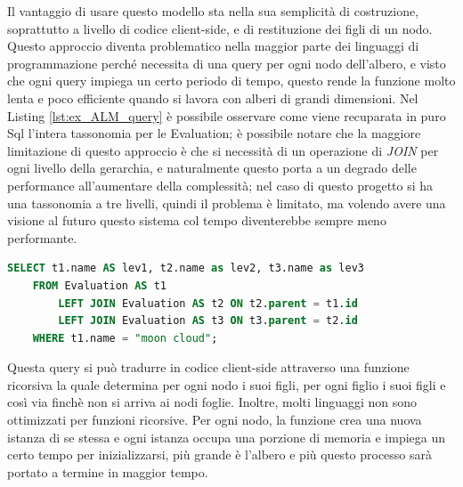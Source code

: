 \hfill\break
Il vantaggio di usare questo modello sta nella sua semplicità di costruzione, soprattutto a livello di codice client-side, 
e di restituzione dei figli di un nodo. Questo approccio diventa problematico nella maggior parte dei linguaggi 
di programmazione perché necessita di una query per ogni nodo dell'albero, e visto che ogni query impiega un certo periodo di tempo, 
questo rende la funzione molto lenta e poco efficiente quando si lavora con alberi di grandi dimensioni.\hfill\break
Nel Listing \ref{lst:ex_ALM_query} è possibile osservare come viene recuparata in puro Sql l'intera tassonomia per le Evaluation; 
è possibile notare che la maggiore limitazione di questo approccio è che si necessità di un operazione di \textit{JOIN} per ogni livello 
della gerarchia, e naturalmente questo porta a un degrado delle performance all'aumentare della complessità; nel caso di questo progetto
si ha una tassonomia a tre livelli, quindi il problema è limitato, ma volendo avere una visione al futuro questo sistema col tempo diventerebbe 
sempre meno performante.
\begin{lstlisting}[language=SQL, label=lst:ex_ALM_query, caption={Query in puro Sql per recuperare l'intera tassonomia delle Evaluation, 
    secondo l'Adjacency List Model.}]
SELECT t1.name AS lev1, t2.name as lev2, t3.name as lev3
    FROM Evaluation AS t1
        LEFT JOIN Evaluation AS t2 ON t2.parent = t1.id
        LEFT JOIN Evaluation AS t3 ON t3.parent = t2.id
    WHERE t1.name = "moon cloud";
\end{lstlisting}
Questa query si può tradurre in codice client-side attraverso una funzione ricorsiva la quale determina per ogni nodo i suoi figli, per ogni figlio
i suoi figli e così via finchè non si arriva ai nodi foglie. Inoltre, molti linguaggi non sono ottimizzati per funzioni ricorsive. 
Per ogni nodo, la funzione crea una nuova istanza di se stessa e ogni istanza occupa una porzione di memoria e impiega un certo 
tempo per inizializzarsi, più grande è l'albero e più questo processo sarà portato a termine in maggior tempo.
%
\newpage
%
